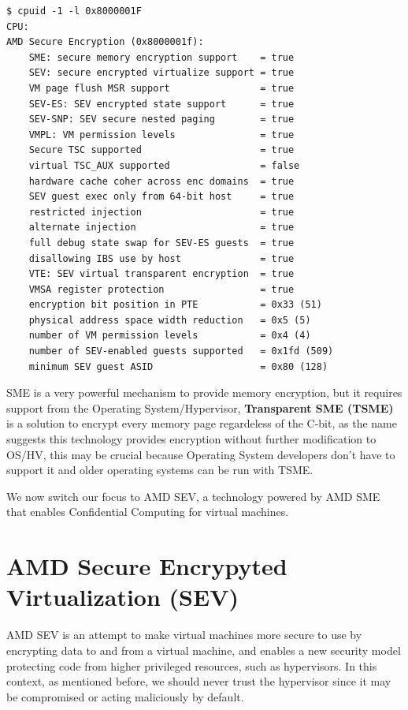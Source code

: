 \documentclass[twocolumn]{article}
\begin{document}
\begin{verbatim}
$ cpuid -1 -l 0x8000001F
CPU:
AMD Secure Encryption (0x8000001f):
    SME: secure memory encryption support    = true
    SEV: secure encrypted virtualize support = true
    VM page flush MSR support                = true
    SEV-ES: SEV encrypted state support      = true
    SEV-SNP: SEV secure nested paging        = true
    VMPL: VM permission levels               = true
    Secure TSC supported                     = true
    virtual TSC_AUX supported                = false
    hardware cache coher across enc domains  = true
    SEV guest exec only from 64-bit host     = true
    restricted injection                     = true
    alternate injection                      = true
    full debug state swap for SEV-ES guests  = true
    disallowing IBS use by host              = true
    VTE: SEV virtual transparent encryption  = true
    VMSA register protection                 = true
    encryption bit position in PTE           = 0x33 (51)
    physical address space width reduction   = 0x5 (5)
    number of VM permission levels           = 0x4 (4)
    number of SEV-enabled guests supported   = 0x1fd (509)
    minimum SEV guest ASID                   = 0x80 (128)
\end{verbatim}
    
SME is a very powerful mechanism to provide memory encryption, but it requires support from the Operating System/Hypervisor, \textbf{Transparent SME (TSME)} is a solution to encrypt every memory page regardeless of the C-bit, as the name suggests this technology provides encryption without further modification to OS/HV, this may be crucial because Operating System developers don't have to support it and older operating systems can be run with TSME.

We now switch our focus to AMD SEV, a technology powered by AMD SME that enables Confidential Computing for virtual machines.

\section{AMD Secure Encrypyted Virtualization (SEV)}

AMD SEV is an attempt to make virtual machines more secure to use by encrypting data to and from a virtual machine, and enables a new security model protecting code from higher privileged resources, such as hypervisors. In this context, as mentioned before, we should never trust the hypervisor since it may be compromised or acting maliciously by default.
\end{document}
